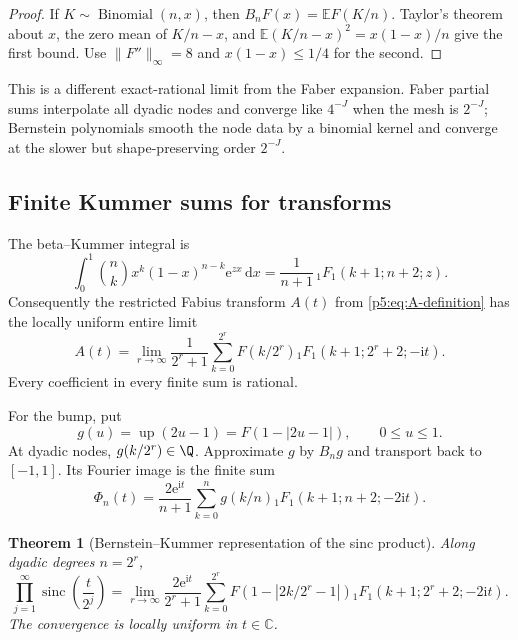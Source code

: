 \documentclass[11pt,oneside]{article}
\newtheorem{theorem}{Theorem}[section]
\theoremstyle{definition}
\newcommand{\dd}{\,\mathrm d}
\newcommand{\e}{\mathrm e}
\newcommand{\ii}{\mathrm i}
\newcommand{\E}{\mathbb E}
\newcommand{\C}{\mathbb C}
\newcommand{\Up}{\operatorname{up}}
\newcommand{\sinc}{\operatorname{sinc}}
\begin{document}
\begin{proof}
If $K\sim\operatorname{Binomial}(n,x)$, then
$B_nF(x)=\E F(K/n)$.  Taylor's theorem about $x$, the zero mean of
$K/n-x$, and
$\E(K/n-x)^2=x(1-x)/n$ give the first bound.  Use
$\|F''\|_\infty=8$ and $x(1-x)\le1/4$ for the second.
\end{proof}

This is a different exact-rational limit from the Faber expansion.  Faber
partial sums interpolate all dyadic nodes and converge like $4^{-J}$ when
the mesh is $2^{-J}$; Bernstein polynomials smooth the node data by a binomial
kernel and converge at the slower but shape-preserving order $2^{-J}$.

\subsection{Finite Kummer sums for transforms}

The beta--Kummer integral is
\begin{equation}
 \int_0^1\binom nkx^k(1-x)^{n-k}\e^{zx}\dd x
 =\frac1{n+1}\,{}_1F_1(k+1;n+2;z).                      \label{p5:eq:beta-kummer}
\end{equation}
Consequently the restricted Fabius transform
$A(t)$ from \eqref{p5:eq:A-definition} has the locally uniform entire limit
\begin{equation}
 \boxed{\displaystyle
 A(t)=\lim_{r\to\infty}\frac1{2^r+1}
 \sum_{k=0}^{2^r}F(k/2^r)
 {}_1F_1(k+1;2^r+2;-\ii t).}                            \label{p5:eq:F-bernstein-kummer}
\end{equation}
Every coefficient in every finite sum is rational.

For the bump, put
\begin{equation}
 g(u)=\Up(2u-1)=F(1-|2u-1|),\qquad 0\le u\le1.           \label{p5:eq:g-up}
\end{equation}
At dyadic nodes, $g(k/2^r)\in\Q$.  Approximate $g$ by $B_ng$ and transport
back to $[-1,1]$.  Its Fourier image is the finite sum
\begin{equation}
 \Phi_n(t)=\frac{2\e^{\ii t}}{n+1}
 \sum_{k=0}^{n}g(k/n)
 {}_1F_1(k+1;n+2;-2\ii t).                              \label{p5:eq:up-bernstein-kummer-finite}
\end{equation}

\begin{theorem}[Bernstein--Kummer representation of the sinc product]
\label{p5:thm:bernstein-kummer}
Along dyadic degrees $n=2^r$,
\begin{equation}
 \boxed{\displaystyle
 \prod_{j=1}^\infty\sinc\!\left(\frac{t}{2^j}\right)
 =\lim_{r\to\infty}
 \frac{2\e^{\ii t}}{2^r+1}
 \sum_{k=0}^{2^r}F(1-|2k/2^r-1|)
 {}_1F_1(k+1;2^r+2;-2\ii t).}                           \label{p5:eq:bernstein-kummer-limit}
\end{equation}
The convergence is locally uniform in $t\in\C$.
\end{theorem}
\end{document}
